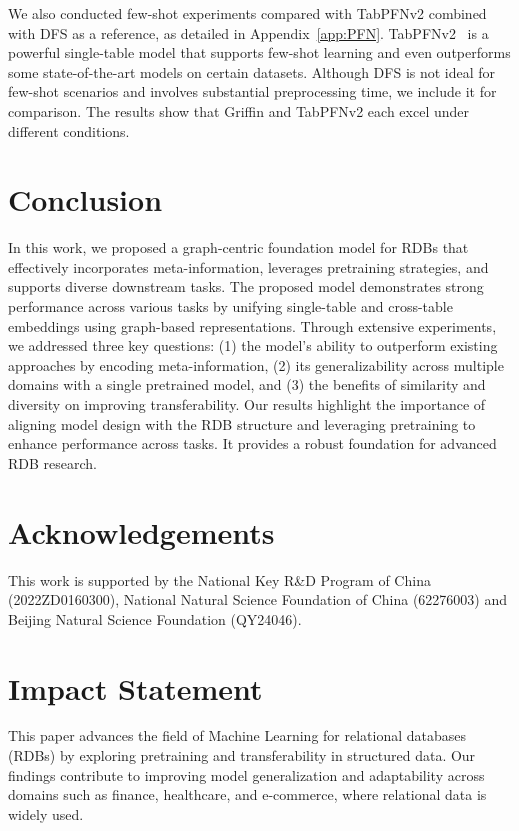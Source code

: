 \documentclass{article}
\theoremstyle{plain}
\theoremstyle{definition}
\theoremstyle{remark}
\begin{document}
We also conducted few-shot experiments compared with TabPFNv2 combined with DFS as a reference, as detailed in Appendix~\ref{app:PFN}. TabPFNv2~\citep{hollmann2025accurate} is a powerful single-table model that supports few-shot learning and even outperforms some state-of-the-art models on certain datasets. Although DFS is not ideal for few-shot scenarios and involves substantial preprocessing time, we include it for comparison. The results show that Griffin and TabPFNv2 each excel under different conditions.

\vspace*{-0.2cm}
\section{Conclusion}
\vspace*{-0.1cm}
In this work, we proposed a graph-centric foundation model for RDBs that effectively incorporates meta-information, leverages pretraining strategies, and supports diverse downstream tasks. The proposed model demonstrates strong performance across various tasks by unifying single-table and cross-table embeddings using graph-based representations. Through extensive experiments, we addressed three key questions: (1) the model’s ability to outperform existing approaches by encoding meta-information, (2) its generalizability across multiple domains with a single pretrained model, and (3) the benefits of similarity and diversity on improving transferability. Our results highlight the importance of aligning model design with the RDB structure and leveraging pretraining to enhance performance across tasks. It provides a robust foundation for advanced RDB research.

\section*{Acknowledgements}
This work is supported by the National Key R\&D Program of China (2022ZD0160300), National Natural Science Foundation of China (62276003) and Beijing Natural Science Foundation (QY24046).

\section*{Impact Statement}  

This paper advances the field of Machine Learning for relational databases (RDBs) by exploring pretraining and transferability in structured data. Our findings contribute to improving model generalization and adaptability across domains such as finance, healthcare, and e-commerce, where relational data is widely used.  
\end{document}
